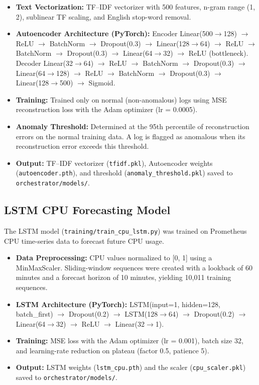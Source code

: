 \documentclass[12pt]{report}
\begin{document}
\begin{itemize}
    \item \textbf{Text Vectorization:} TF--IDF vectorizer with 500 features, n-gram range (1, 2), sublinear TF scaling, and English stop-word removal.
    \item \textbf{Autoencoder Architecture (PyTorch):} Encoder Linear(500$\rightarrow$128) $\rightarrow$ ReLU $\rightarrow$ BatchNorm $\rightarrow$ Dropout(0.3) $\rightarrow$ Linear(128$\rightarrow$64) $\rightarrow$ ReLU $\rightarrow$ BatchNorm $\rightarrow$ Dropout(0.3) $\rightarrow$ Linear(64$\rightarrow$32) $\rightarrow$ ReLU (bottleneck). Decoder Linear(32$\rightarrow$64) $\rightarrow$ ReLU $\rightarrow$ BatchNorm $\rightarrow$ Dropout(0.3) $\rightarrow$ Linear(64$\rightarrow$128) $\rightarrow$ ReLU $\rightarrow$ BatchNorm $\rightarrow$ Dropout(0.3) $\rightarrow$ Linear(128$\rightarrow$500) $\rightarrow$ Sigmoid.
    \item \textbf{Training:} Trained only on normal (non-anomalous) logs using MSE reconstruction loss with the Adam optimizer (lr = 0.0005).
    \item \textbf{Anomaly Threshold:} Determined at the 95th percentile of reconstruction errors on the normal training data. A log is flagged as anomalous when its reconstruction error exceeds this threshold.
    \item \textbf{Output:} TF--IDF vectorizer (\texttt{tfidf.pkl}), Autoencoder weights (\texttt{autoencoder.pth}), and threshold (\texttt{anomaly\_threshold.pkl}) saved to \texttt{orchestrator/models/}.
\end{itemize}

\subsection{LSTM CPU Forecasting Model}

The LSTM model (\texttt{training/train\_cpu\_lstm.py}) was trained on Prometheus CPU time-series data to forecast future CPU usage.

\begin{itemize}
    \item \textbf{Data Preprocessing:} CPU values normalized to [0, 1] using a MinMaxScaler. Sliding-window sequences were created with a lookback of 60 minutes and a forecast horizon of 10 minutes, yielding 10,011 training sequences.
    \item \textbf{LSTM Architecture (PyTorch):} LSTM(input=1, hidden=128, batch\_first) $\rightarrow$ Dropout(0.2) $\rightarrow$ LSTM(128$\rightarrow$64) $\rightarrow$ Dropout(0.2) $\rightarrow$ Linear(64$\rightarrow$32) $\rightarrow$ ReLU $\rightarrow$ Linear(32$\rightarrow$1).
    \item \textbf{Training:} MSE loss with the Adam optimizer (lr = 0.001), batch size 32, and learning-rate reduction on plateau (factor 0.5, patience 5).
    \item \textbf{Output:} LSTM weights (\texttt{lstm\_cpu.pth}) and the scaler (\texttt{cpu\_scaler.pkl}) saved to \texttt{orchestrator/models/}.
\end{itemize}
\end{document}
